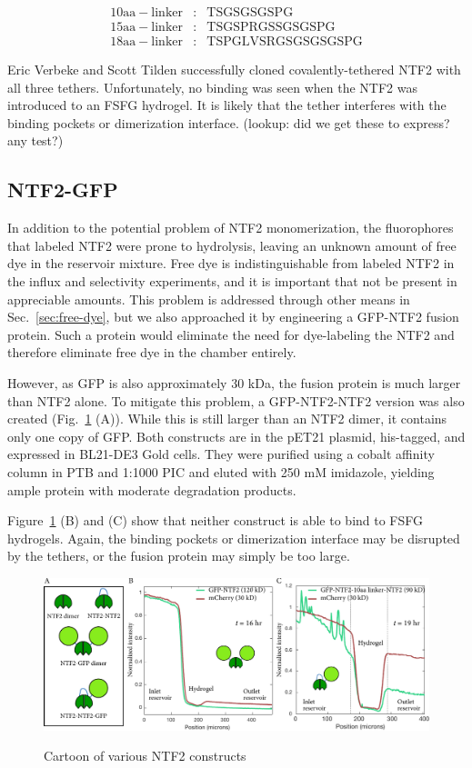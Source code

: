 \begin{align*}
\mathrm{10aa-linker}&:&\mathrm{TSGSGSGSPG}\\
\mathrm{15aa-linker}&:&\mathrm{TSGSPRGSSGSGSPG}\\
\mathrm{18aa-linker}&:&\mathrm{TSPGLVSRGSGSGSGSPG}
\end{align*}

Eric Verbeke and Scott Tilden successfully cloned covalently-tethered NTF2 with all three tethers.  Unfortunately, no binding was seen when the NTF2 was introduced to an FSFG hydrogel.  It is likely that the tether interferes with the binding pockets or dimerization interface. (lookup: did we get these to express?  any test?)

\subsection{NTF2-GFP}

In addition to the potential problem of NTF2 monomerization, the fluorophores that labeled NTF2 were prone to hydrolysis, leaving an unknown amount of free dye in the reservoir mixture.  Free dye is indistinguishable from labeled NTF2 in the influx and selectivity experiments, and it is important that not be present in appreciable amounts.  This problem is addressed through other means in Sec.~\ref{sec:free-dye}, but we also approached it by engineering a GFP-NTF2 fusion protein.  Such a protein would eliminate the need for dye-labeling the NTF2 and therefore eliminate free dye in the chamber entirely.  

However, as GFP is also approximately 30 kDa, the fusion protein is much larger than NTF2 alone.  To mitigate this problem, a GFP-NTF2-NTF2 version was also created (Fig.~\ref{fig:NTF2} (A)).  While this is still larger than an NTF2 dimer, it contains only one copy of GFP.  Both constructs are in the pET21 plasmid, his-tagged, and expressed in BL21-DE3 Gold cells.  They were purified using a cobalt affinity column in PTB and 1:1000 PIC and eluted with 250 mM imidazole, yielding ample protein with moderate degradation products.

Figure~\ref{fig:NTF2} (B) and (C) show that neither construct is able to bind to FSFG hydrogels.  Again, the binding pockets or dimerization interface may be disrupted by the tethers, or the fusion protein may simply be too large.

\begin{figure} %
\caption{Cartoon of various NTF2 constructs}
\centering
\includegraphics[width=\textwidth]{figs/ch03/NTF2-constructs}
\label{fig:NTF2}
\end{figure}

